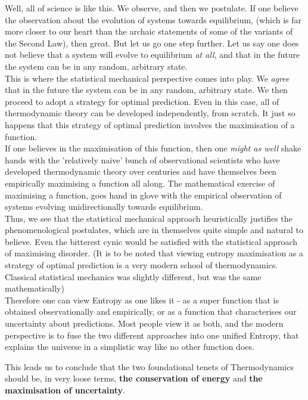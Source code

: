 \documentclass[oneside]{book}
\begin{document}
Well, all of science is like this. We observe, and then we postulate. If one believe the observation about the evolution of systems towards equilibrium, (which is far more closer to our heart than the archaic statements of some of the variants of the Second Law), then great. But let us go one step further. Let us say one does not believe that a system will evolve to equilibrium \emph{at all}, and that in the future the system can be in any random, arbitrary state.\\

This is where the statistical mechanical perspective comes into play. We \emph{agree} that in the future the system can be in any random, arbitrary state. We then proceed to adopt a strategy for optimal prediction. Even in this case, all of thermodynamic theory can be developed independently, from scratch. It just so happens that this strategy of optimal prediction involves the maximisation of a function. \\

If one believes in the maximisation of this function, then one \emph{might as well} shake hands with the 'relatively naive' bunch of observational scientists who have developed thermodynamic theory over centuries and have themselves been empirically maximising a function all along. The mathematical exercise of maximising a function, goes hand in glove with the empirical observation of systems evolving unidirectionally towards equilibrium. \\

Thus, we see that the statistical mechanical approach heuristically justifies the phenomenological postulates, which are in themselves quite simple and natural to believe. Even the bitterest cynic would be satisfied with the statistical approach of maximising disorder. (It is to be noted that viewing entropy maximisation as a strategy of optimal prediction is a very modern school of thermodynamics. Classical statistical mechanics was slightly different, but was the same mathematically)\\

Therefore one can view Entropy as one likes it - as a super function that is obtained observationally and empirically, or as a function that characterises our uncertainty about predictions. Most people view it as both, and the modern perspective is to fuse the two different approaches into one unified Entropy, that explains the universe in a simplistic way like no other function does. 


\begin{mdframed}[style=exercise]
This leads us to conclude that the two foundational tenets of Thermodynamics should be, in very loose terms, \textbf{the conservation of energy} and \textbf{the maximisation of uncertainty}.
\end{mdframed}
 
\end{document}
